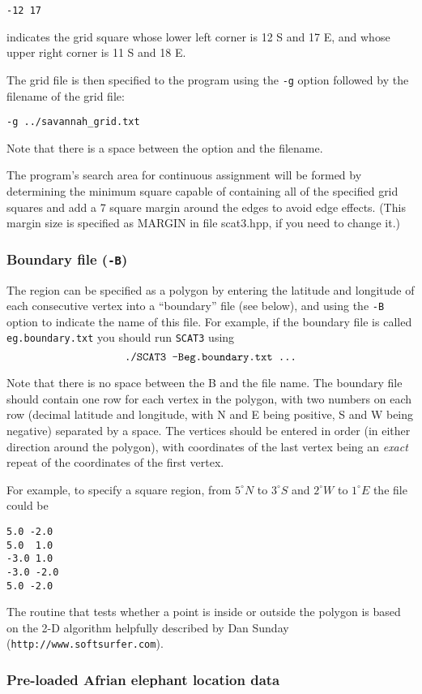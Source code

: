 \documentclass[10pt,titlepage,times,letterpaper]{article}
\def\SCAT{{\tt SCAT3} }
\begin{document}
{\tt -12 17}

indicates the grid square whose lower left corner is 12 S and 17 E, and whose upper right 
corner is 11 S and 18 E.

The grid file is then specified to the program using the {\tt -g} option followed
by the filename of the grid file:

{\tt -g ../savannah\_grid.txt}

Note that there is a space between the option and the filename.

The program's search area for continuous assignment will be formed by determining
the minimum square capable of containing all of the specified 
grid squares and add a 7 square margin around the edges to avoid edge effects.
(This margin size is specified as MARGIN in file scat3.hpp, if you need
to change it.)

\subsubsection{Boundary file  ({\tt -B})}
The region can be specified as a polygon by entering the latitude and longitude of
each consecutive vertex into a ``boundary'' file (see below), and using
the {\tt -B} option to indicate the name of this file.
For example, if the boundary file is called {\tt eg.boundary.txt} you
should run \SCAT using
$$\text{\tt ./SCAT3 -Beg.boundary.txt ...}$$ 

Note that there is no space between the B and the file name.
The boundary file should contain one row for each vertex in the
polygon, with two numbers on each row (decimal latitude and longitude,
with N and E being positive, S and W being negative) separated by a
space. The vertices should be entered in order (in either direction
around the polygon), with coordinates of the last vertex being an {\it
exact} repeat of the coordinates of the first vertex.

For example, to specify a square region, from $5^\circ N$ to $3^\circ S$ and
$2^\circ W$ to $1^\circ E$ the file could be
\begin{verbatim}
5.0 -2.0
5.0  1.0
-3.0 1.0
-3.0 -2.0
5.0 -2.0
\end{verbatim}

The routine that tests whether a point is inside or outside the polygon
is based on the 2-D algorithm helpfully
described by Dan Sunday ({\tt http://www.softsurfer.com}). 

\subsubsection{Pre-loaded Afrian elephant location data}
\end{document}
